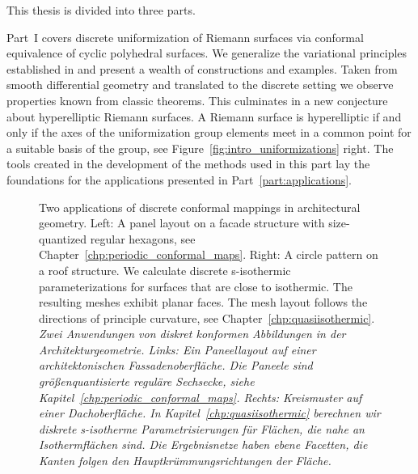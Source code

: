 \documentclass[Thesis.tex]{subfiles}
\begin{document}
This thesis is divided into three parts. 

Part~I covers discrete uniformization of Riemann surfaces via conformal equivalence of cyclic polyhedral surfaces.
We generalize the variational principles established in \cite{Bobenko2010} and present a wealth of constructions and examples. 
Taken from smooth differential geometry and translated to the discrete setting we observe properties known from classic theorems. 
This culminates in a new conjecture about hyperelliptic Riemann surfaces. 
A Riemann surface is hyperelliptic if and only if the axes of the uniformization group elements meet in a common point for a suitable basis of the group, see Figure~\ref{fig:intro_uniformizations} right.
The tools created in the development of the methods used in this part lay the foundations for the applications presented in Part~\ref{part:applications}.

\begin{figure}
\centering
{}
\caption{
Two applications of discrete conformal mappings in architectural geometry. 
Left: A panel layout on a facade structure with size-quantized regular hexagons, see Chapter~\ref{chp:periodic_conformal_maps}.
Right: A circle pattern on a roof structure. 
We calculate discrete s-isothermic parameterizations for surfaces that are close to isothermic.
The resulting meshes exhibit planar faces. 
The mesh layout follows the directions of principle curvature, see Chapter~\ref{chp:quasiisothermic}.\\
\it Zwei Anwendungen von diskret konformen Abbildungen in der Architekturgeometrie. 
Links: Ein Paneellayout auf einer architektonischen Fassadenoberfl\"{a}che. 
Die Paneele sind gr\"{o}{\ss}enquantisierte regul\"{a}re Sechsecke, siehe Kapitel~\ref{chp:periodic_conformal_maps}.
Rechts: Kreismuster auf einer Dachoberfl\"{a}che.
In Kapitel~\ref{chp:quasiisothermic} berechnen wir diskrete s-isotherme Parametrisierungen f\"{u}r Fl\"{a}chen, die nahe an Isothermfl\"{a}chen sind.
Die Ergebnisnetze haben ebene Facetten, die Kanten folgen den Hauptkr\"{u}mmungsrichtungen der Fl\"{a}che. 
}
\label{fig:intro_applications} 
\end{figure}
\end{document}
